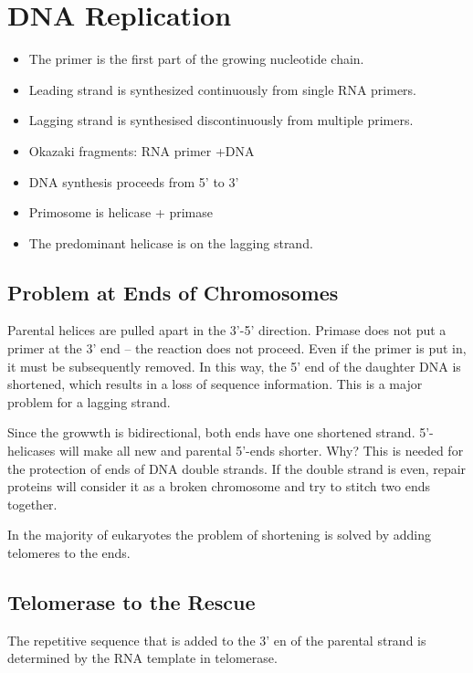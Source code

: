 \documentclass[11pt]{scrartcl}
\begin{document}
\section{DNA Replication}
\begin{remark}
\begin{itemize}
\item The primer is the first part of the growing nucleotide chain.
\item Leading strand is synthesized continuously from single RNA primers.
\item Lagging strand is synthesised discontinuously from multiple primers.
\item Okazaki fragments: RNA primer +DNA
\item DNA synthesis proceeds from 5' to 3'
\item Primosome is helicase + primase
\item The predominant helicase is on the lagging strand.
\end{itemize}
\end{remark}

\subsection{Problem at Ends of Chromosomes}

Parental helices are pulled apart in the 3'-5' direction. Primase does
not put a primer at the 3' end -- the reaction does not proceed. Even
if the primer is put in, it must be subsequently removed. In this way,
the 5' end of the daughter DNA is shortened, which results in a loss
of sequence information. This is a major problem for a lagging
strand.

Since the growwth is bidirectional, both ends have one shortened
strand. 5'-helicases will make all new and parental 5'-ends
shorter. Why? This is needed for the protection of ends of DNA double
strands. If the double strand is even, repair proteins will consider
it as a broken chromosome and try to stitch two ends together.

In the majority of eukaryotes the problem of shortening is solved by
adding telomeres to the ends.

\subsection{Telomerase to the Rescue}

The repetitive sequence that is added to the 3' en of the parental
strand is determined by the RNA template in telomerase.
\end{document}
